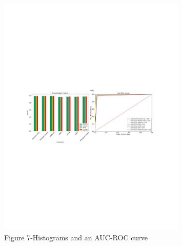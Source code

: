 \begin{figure}[H]
	\centering
	\includegraphics[width=0.8\textwidth]{media/ict/image85}
	\caption*{Figure 7-Histograms and an AUC-ROC curve}
\end{figure}

